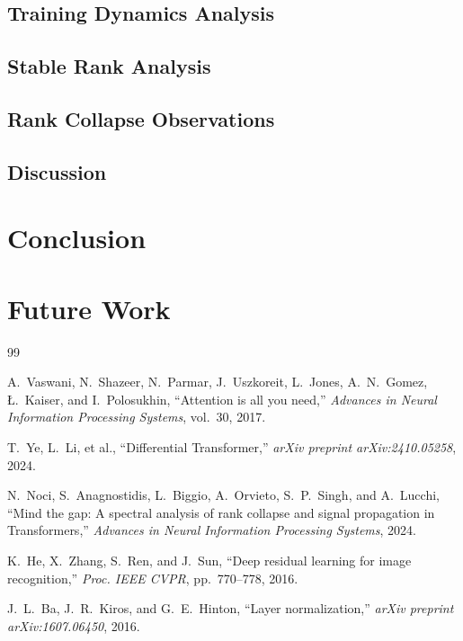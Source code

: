 \documentclass[12pt, a4paper]{article}
\begin{document}
\subsection{Training Dynamics Analysis}

\subsection{Stable Rank Analysis}

\subsection{Rank Collapse Observations}

\subsection{Discussion}

\section{Conclusion}

\section{Future Work}

\newpage
\begin{thebibliography}{99}

A.~Vaswani, N.~Shazeer, N.~Parmar, J.~Uszkoreit, L.~Jones, A.~N.~Gomez,
\L.~Kaiser, and I.~Polosukhin,
``Attention is all you need,''
\textit{Advances in Neural Information Processing Systems}, vol.~30, 2017.

T.~Ye, L.~Li, et al.,
``Differential Transformer,''
\textit{arXiv preprint arXiv:2410.05258}, 2024.

N.~Noci, S.~Anagnostidis, L.~Biggio, A.~Orvieto, S.~P.~Singh, and A.~Lucchi,
``Mind the gap: A spectral analysis of rank collapse and signal propagation in Transformers,''
\textit{Advances in Neural Information Processing Systems}, 2024.

K.~He, X.~Zhang, S.~Ren, and J.~Sun,
``Deep residual learning for image recognition,''
\textit{Proc. IEEE CVPR}, pp.~770--778, 2016.

J.~L.~Ba, J.~R.~Kiros, and G.~E.~Hinton,
``Layer normalization,''
\textit{arXiv preprint arXiv:1607.06450}, 2016.

\end{thebibliography}
\end{document}

